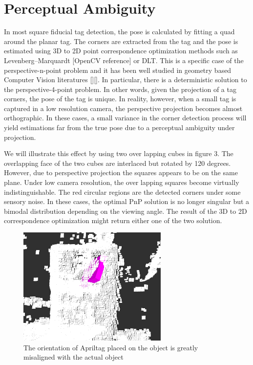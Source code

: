 \section{Perceptual Ambiguity}
\label{sec:problem}
In most square fiducial tag detection, the pose is calculated by fitting a quad around the planar tag. The corners are extracted from the tag and the pose is estimated using 3D to 2D point correspondence optimization methods such as Levenberg–Marquardt [OpenCV reference] or DLT. This is a specific case of the perspective-n-point problem and it has been well studied in geometry based Computer Vision literatures [][]. In particular, there is a deterministic solution to the perspective-4-point problem. In other words, given the projection of a tag corners, the pose of the tag is unique. In reality, however,  when a small tag is captured in a low resolution camera, the perspective projection becomes almost orthographic. In these cases, a small variance in the corner detection process will yield estimations far from the true pose due to a perceptual ambiguity under projection. 

We will illustrate this effect by using two over lapping cubes in figure 3. The overlapping face of the two cubes are interlaced but rotated by 120 degrees. However, due to perspective projection the squares appears to be on the same plane. Under low camera resolution, the over lapping squares become virtually indistinguishable. The red circular regions are the detected corners under some sensory noise. In these cases, the optimal PnP solution is no longer singular but a bimodal distribution depending on the viewing angle. The result of the 3D to 2D correspondence optimization might return either one of the two solution.
\begin{figure}
\centering
\includegraphics[width=\columnwidth]{figs/mismatch_tag}
\caption{The orientation of Apriltag placed on the object is greatly misaligned with the actual object}
\label{fig:calib}
\end{figure}

